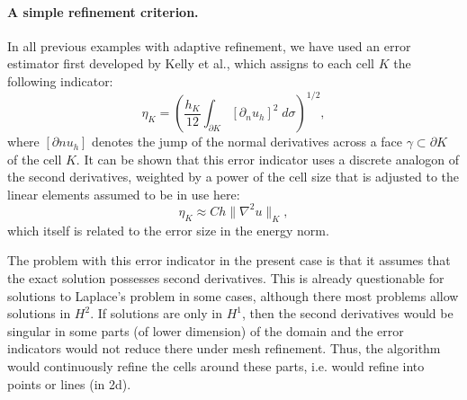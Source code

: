 \documentclass{article}
\begin{document}
\paragraph{A simple refinement criterion.}
In all previous examples with adaptive refinement, we have used an
error estimator first developed by Kelly et al., which assigns to each
cell $K$ the following indicator:
$$
  \eta_K =
  \left(
    \frac {h_K}{12}
    \int_{\partial K}
      [\partial_n u_h]^2 \; d\sigma
  \right)^{1/2},
$$
where $[\partial n u_h]$ denotes the jump of the normal derivatives
across a face $\gamma\subset\partial K$ of the cell $K$. It can be
shown that this error indicator uses a discrete analogon of the second
derivatives, weighted by a power of the cell size that is adjusted to
the linear elements assumed to be in use here:
$$
  \eta_K \approx 
  C h \| \nabla^2 u \|_K,
$$
which itself is related to the error size in the energy norm.

The problem with this error indicator in the present case is that it
assumes that the exact solution possesses second derivatives. This is
already questionable for solutions to Laplace's problem in some cases,
although there most problems allow solutions in $H^2$. If solutions
are only in $H^1$, then the second derivatives would be singular in
some parts (of lower dimension) of the domain and the error indicators
would not reduce there under mesh refinement. Thus, the algorithm
would continuously refine the cells around these parts, i.e. would
refine into points or lines (in 2d).
\end{document}

